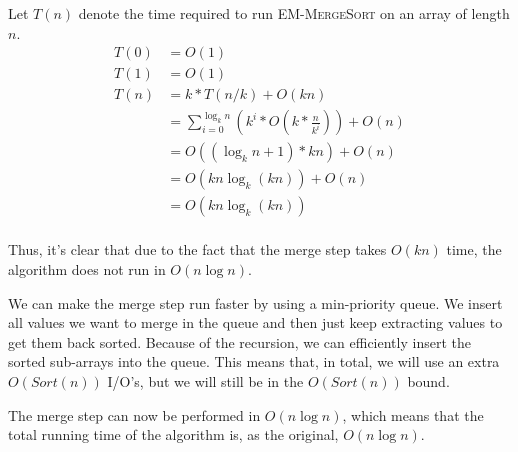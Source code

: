 Let $T(n)$ denote the time required to run \textsc{EM-MergeSort} on an array of length $n$.
\begin{equation}
\begin{split}
T(0) &= O(1)\\
T(1) &= O(1)\\
T(n) &= k * T(n/k) + O(k n)\\
&= \sum_{i = 0}^{\log_k{n}} (k^i * O(k * \frac{n}{k^i})) + O(n)\\
&= O((\log_k{n} + 1) *  k n)+ O(n)\\
&= O(k n \log_k{(k n)}) + O(n)\\
&= O(k n \log_k{(k n)})\\
\end{split}
\end{equation}

Thus, it's clear that due to the fact that the merge step takes $O(k n)$ time, the algorithm does not run in $O(n \log{n})$.

We can make the merge step run faster by using a min-priority queue.
We insert all values we want to merge in the queue and then just keep extracting values to get them back sorted.
Because of the recursion, we can efficiently insert the sorted sub-arrays into the queue.
This means that, in total, we will use an extra $O(Sort(n))$ I/O's, but we will still be in the $O(Sort(n))$ bound.

The merge step can now be performed in $O(n \log{n})$, which means that the total running time of the algorithm is, as the original, $O(n \log{n})$.
